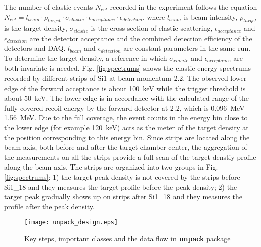 \documentclass[fleqn,twocolumn,a4paper]{ikpar}
\begin{document}
The number of elastic events $N_{evt}$ recorded in the experiment follows the
equation $N_{evt} =
l_{beam}\cdot\rho_{target}\cdot\sigma_{elastic}\cdot\epsilon_{acceptance}\cdot\epsilon_{detection}$,
where $l_{beam}$ is beam intensity, $\rho_{target}$ is the target density,
$\sigma_{elastic}$ is the cross section of elastic scattering,
$\epsilon_{acceptance}$ and $\epsilon_{detection}$ are the detector acceptance
and the combined
detection efficiency of the detectors and DAQ.
$l_{beam}$ and $\epsilon_{detection}$ are constant parameters in the same run.
To determine the target density, a reference in which $\sigma_{elasitc}$ and
$\epsilon_{acceptance}$ are both invariate is needed.
Fig. \ref{fig:spectrums} shows the elastic energy spectrums recorded by
different strips of Si1 at beam momentum \SI{2.2}{\mom}.
The observed lower edge of the forward acceptance is about \SI{100}{\keV} while the
trigger threshold is about \SI{50}{\keV}.
The lower edge is in accordance with the calculated range of the
fully-covered recoil energy by the forward detector at \SI{2.2}{\mom},
which is \SIrange{0.096}{1.56}{\MeV}.
Due to the full coverage, the event counts in the energy bin close to the lower edge (for example
\SI{120}{\keV}) acts as the meter of the target density at the position
corresponding to this energy bin.
Since strips are located along the beam axis, both before and after the target
chamber center, the aggregation of the measurements on all the strips provide a full scan of the target denstiy profile along the beam axis.
The strips are organized into two groups in Fig. \ref{fig:spectrums}: 1) the
target peak density is not covered by the strips
before Si1_18 and they measures the target profile before the peak density; 2) the target
peak gradually shows up on strips after Si1_18 and they measures the profile
after the peak density.

\begin{figure}[!htb]
	\texttt{[image: unpack\_design.eps]}
  	\caption{Key steps, important classes and the data flow in \textbf{unpack} package}
  	\label{fig:unpack_design}
\end{figure}
\end{document}
